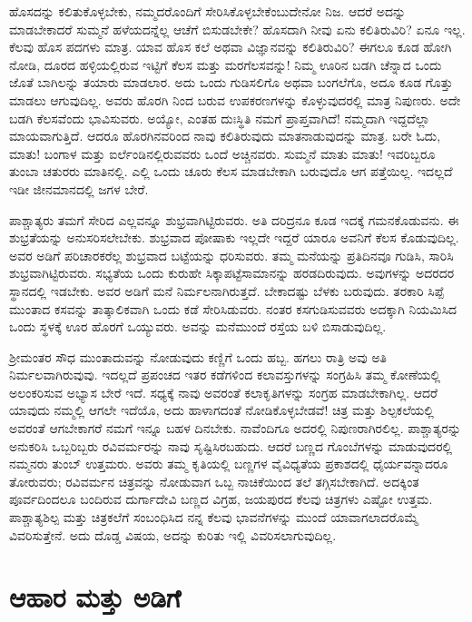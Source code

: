 ಹೊಸದನ್ನು ಕಲಿತುಕೊಳ್ಳಬೇಕು, ನಮ್ಮದರೊಂದಿಗೆ ಸೇರಿಸಿಕೊಳ್ಳಬೇಕೆಂಬುದೇನೋ ನಿಜ. ಆದರೆ ಅದನ್ನು ಮಾಡಬೇಕಾದರೆ ಸುಮ್ಮನೆ ಹಳೆಯದನ್ನೆಲ್ಲ ಆಚೆಗೆ ಬಿಸುಡಬೇಕೇ? ಹೊಸದಾಗಿ ನೀವು ಏನು ಕಲಿತಿರುವಿರಿ? ಏನೂ ಇಲ್ಲ. ಕೆಲವು ಹೊಸ ಪದಗಳು ಮಾತ್ರ. ಯಾವ ಹೊಸ ಕಲೆ ಅಥವಾ ವಿಜ್ಞಾನವನ್ನು ಕಲಿತಿರುವಿರಿ? ಈಗಲೂ ಕೂಡ ಹೋಗಿ ನೋಡಿ, ದೂರದ ಹಳ್ಳಿಯಲ್ಲಿರುವ ಇಟ್ಟಿಗೆ ಕೆಲಸ ಮತ್ತು ಮರಗೆಲಸವನ್ನು! ನಿಮ್ಮ ಊರಿನ ಬಡಗಿ ಚೆನ್ನಾದ ಒಂದು ಜೊತೆ ಬಾಗಿಲನ್ನು ತಯಾರು ಮಾಡಲಾರ. ಅದು ಒಂದು ಗುಡಿಸಲಿಗೊ ಅಥವಾ ಬಂಗಲೆಗೊ, ಅದೂ ಕೂಡ ಗೊತ್ತು ಮಾಡಲು ಆಗುವುದಿಲ್ಲ. ಅವರು ಹೊರಗಿ ನಿಂದ ಬರುವ ಉಪಕರಣಗಳನ್ನು ಕೊಳ್ಳುವುದರಲ್ಲಿ ಮಾತ್ರ ನಿಪುಣರು. ಅದೇ ಬಡಗಿ ಕೆಲಸವೆಂದು ಭಾವಿಸುವರು. ಅಯ್ಯೋ, ಎಂತಹ ದುಃಸ್ಥಿತಿ ನಮಗೆ ಪ್ರಾಪ್ತವಾಗಿದೆ! ನಮ್ಮದಾಗಿ ಇದ್ದದೆಲ್ಲಾ ಮಾಯವಾಗುತ್ತಿದೆ. ಆದರೂ ಹೊರಗಿನವರಿಂದ ನಾವು ಕಲಿತಿರುವುದು ಮಾತನಾಡುವುದನ್ನು ಮಾತ್ರ. ಬರೇ ಓದು, ಮಾತು! ಬಂಗಾಳ ಮತ್ತು ಐರ್ಲೆಂಡಿನಲ್ಲಿರುವವರು ಒಂದೆ ಅಚ್ಚಿನವರು. ಸುಮ್ಮನೆ ಮಾತು ಮಾತು! ಇವರಿಬ್ಬರೂ ತುಂಬಾ ಚತುರರು ಮಾತಿನಲ್ಲಿ. ಎಲ್ಲಿ ಒಂದು ಚೂರು ಕೆಲಸ ಮಾಡಬೇಕಾಗಿ ಬರುವುದೊ ಆಗ ಪತ್ತೆಯಿಲ್ಲ. ಇದಲ್ಲದೆ ಇಡೀ ಜೀನಮಾನದಲ್ಲಿ ಜಗಳ ಬೇರೆ.

ಪಾಶ್ಚಾತ್ಯರು ತಮಗೆ ಸೇರಿದ ಎಲ್ಲವನ್ನೂ ಶುಭ್ರವಾಗಿಟ್ಟಿರುವರು. ಅತಿ ದರಿದ್ರನೂ ಕೂಡ ಇದಕ್ಕೆ ಗಮನಕೊಡುವನು. ಈ ಶುಭ್ರತೆಯನ್ನು ಅನುಸರಿಸಲೇಬೇಕು. ಶುಭ್ರವಾದ ಪೋಷಾಕು ಇಲ್ಲದೇ ಇದ್ದರೆ ಯಾರೂ ಅವನಿಗೆ ಕೆಲಸ ಕೊಡುವುದಿಲ್ಲ. ಅವರ ಅಡಿಗೆ ಪರಿಚಾರಕರೆಲ್ಲ ಶುಭ್ರವಾದ ಬಟ್ಟೆಯನ್ನು ಧರಿಸುವರು. ತಮ್ಮ ಮನೆಯನ್ನು ಪ್ರತಿದಿನವೂ ಗುಡಿಸಿ, ಸಾರಿಸಿ ಶುಭ್ರವಾಗಿಟ್ಟಿರುವರು. ಸಭ್ಯತೆಯ ಒಂದು ಕುರುಹೇ ಸಿಕ್ಕಾಪಟ್ಟೆ\break ಸಾಮಾನನ್ನು ಹರಡದಿರುವುದು. ಅವುಗಳನ್ನು ಅದರದರ ಸ್ಥಾನದಲ್ಲಿ ಇಡಬೇಕು. ಅವರ ಅಡಿಗೆ ಮನೆ ನಿರ್ಮಲನಾಗಿರುತ್ತದೆ. ಬೇಕಾದಷ್ಟು ಬೆಳಕು ಬರುವುದು. ತರಕಾರಿ ಸಿಪ್ಪೆ ಮುಂತಾದ ಕಸವನ್ನು ತಾತ್ಕಾಲಿಕವಾಗಿ ಒಂದು ಕಡೆ ಸೇರಿಸಿಡುವರು. ನಂತರ ಕಸಗುಡಿಸು\break ವವರು ಅದಕ್ಕಾಗಿ ನಿಯಮಿಸಿದ ಒಂದು ಸ್ಥಳಕ್ಕೆ ಊರ ಹೊರಗೆ ಒಯ್ಯುವರು. ಅವನ್ನು ಮನೆಮುಂದೆ ರಸ್ತೆಯ ಬಳಿ ಬಿಸಾಡುವುದಿಲ್ಲ.

ಶ‍್ರೀಮಂತರ ಸೌಧ ಮುಂತಾದುವನ್ನು ನೋಡುವುದು ಕಣ್ಣಿಗೆ ಒಂದು ಹಬ್ಬ. ಹಗಲು ರಾತ್ರಿ ಅವು ಅತಿ ನಿರ್ಮಲವಾಗಿರುವುವು. ಇದಲ್ಲದೆ ಪ್ರಪಂಚದ ಇತರ ಕಡೆಗಳಿಂದ ಕಲಾವಸ್ತುಗಳನ್ನು ಸಂಗ್ರಹಿಸಿ ತಮ್ಮ ಕೋಣೆಯಲ್ಲಿ ಅಲಂಕರಿಸುವ ಅಭ್ಯಾಸ ಬೇರೆ ಇದೆ. ಸಧ್ಯಕ್ಕೆ ನಾವು ಅವರಂತೆ ಕಲಾಕೃತಿಗಳನ್ನು ಸಂಗ್ರಹ ಮಾಡಬೇಕಾಗಿಲ್ಲ. ಆದರೆ ಯಾವುದು ನಮ್ಮಲ್ಲಿ ಆಗಲೇ ಇದೆಯೊ, ಅದು ಹಾಳಾಗದಂತೆ ನೋಡಿಕೊಳ್ಳಬೇಡವೆ! ಚಿತ್ರ ಮತ್ತು ಶಿಲ್ಪಕಲೆಯಲ್ಲಿ ಅವರಂತೆ ಆಗಬೇಕಾಗರೆ ನಮಗೆ ಇನ್ನೂ ಬಹಳ ದಿನಬೇಕು. ನಾವೆಂದಿಗೂ ಅದರಲ್ಲಿ ನಿಪುಣರಾಗಿರಲಿಲ್ಲ. ಪಾಶ್ಚಾತ್ಯರನ್ನು ಅನುಕರಿಸಿ ಒಬ್ಬರಿಬ್ಬರು ರವಿವರ್ಮರನ್ನು ನಾವು ಸೃಷ್ಟಿಸಿರಬಹುದು. ಆದರೆ ಬಣ್ಣದ ಗೊಂಬೆಗಳನ್ನು ಮಾಡುವುದರಲ್ಲಿ ನಮ್ಮನರು ತುಂಬ್ ಉತ್ತಮರು. ಅವರು ತಮ್ಮ ಕೃತಿಯಲ್ಲಿ ಬಣ್ಣಗಳ ವೈವಿಧ್ಯತೆಯ ಪ್ರಕಾಶದಲ್ಲಿ ಧೈರ್ಯವನ್ನಾದರೂ ತೋರುವರು; ರವಿವರ್ಮನ ಚಿತ್ರವನ್ನು ನೋಡುವಾಗ ಒಬ್ಬ ನಾಚಿಕೆ\break ಯಿಂದ ತಲೆ ತಗ್ಗಿಸಬೇಕಾಗಿದೆ. ಅದಕ್ಕಿಂತ ಪೂರ್ವದಿಂದಲೂ ಬಂದಿರುವ ದುರ್ಗಾದೇವಿ ಬಣ್ಣದ ವಿಗ್ರಹ, ಜಯಪುರದ ಕೆಲವು ಚಿತ್ರಗಳು ಎಷ್ಟೋ ಉತ್ತಮ. ಪಾಶ್ಚಾತ್ಯಶಿಲ್ಪ ಮತ್ತು ಚಿತ್ರಕಲೆಗೆ ಸಂಬಂಧಿಸಿದ ನನ್ನ ಕೆಲವು ಭಾವನೆಗಳನ್ನು ಮುಂದೆ ಯಾವಾಗಲಾದರೊಮ್ಮೆ ವಿವರಿಸುತ್ತೇನೆ. ಅದು ದೊಡ್ಡ ವಿಷಯ, ಅದನ್ನು ಕುರಿತು ಇಲ್ಲಿ ವಿವರಿಸಲಾಗುವುದಿಲ್ಲ.

\newpage

\section*{ಆಹಾರ ಮತ್ತು ಅಡಿಗೆ}

